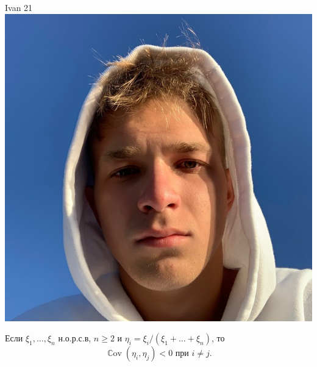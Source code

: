 \documentclass[12pt]{article}
\DeclareMathOperator{\Cov}{\mathbb{C}ov}
\begin{document}
\begin{minipage}{0.45\textwidth}
\begin{tinderm}{Ivan 21}
\includegraphics[width=\textwidth]{tinder-photo/ivan.jpg}

  

\begin{mybox}
Если $\xi_1, \dots, \xi_n$ н.о.р.с.в, $n \ge 2$ и $\eta_i = \xi_i /(\xi_1 + \dots + \xi_n)$, то 
\[
\Cov(\eta_i, \eta_j) < 0\text{ при } i \neq j.
\]
\end{mybox}
\end{tinderm}
\end{minipage}
%
%
\end{document}
